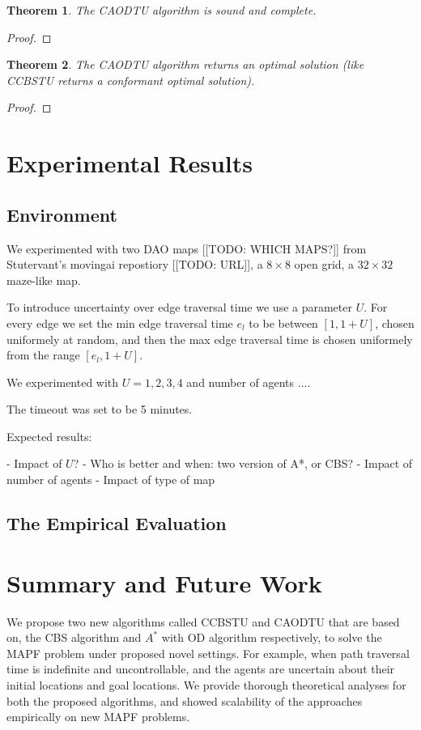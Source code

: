 \documentclass{article}
\newtheorem{theorem}{Theorem}
\begin{document}
{\begin{theorem}
The CAODTU algorithm is sound and complete.
\end{theorem}
\begin{proof}

\end{proof}

\begin{theorem}
The CAODTU algorithm returns an optimal solution (like CCBSTU returns a conformant optimal solution).
\end{theorem}
\begin{proof}

\end{proof}

\section{Experimental Results}

\subsection{Environment}

We experimented with 
two DAO maps [[TODO: WHICH MAPS?]] 
from Stutervant's movingai repostiory [[TODO: URL]], 
a $8\times 8$ open grid,
a $32\times 32$ maze-like map. 


To introduce uncertainty over edge traversal time we use a parameter $U$. 
For every edge we set the min edge traversal time $e_l$ to be between $[1,1+U]$, chosen uniformely at random, 
and then the max edge traversal time is chosen uniformely from the range $[e_l,1+U]$.


We experimented with $U=1,2,3,4$
and number of agents $....$

The timeout was set to be 5 minutes. 


Expected results:

- Impact of $U$?
- Who is better and when: two version of A*, or CBS?
- Impact of number of agents
- Impact of type of map

\subsection{The Empirical Evaluation}

\section{Summary and Future Work}
We propose two new algorithms called CCBSTU and CAODTU that are based on, the CBS algorithm and $A^*$ with OD algorithm respectively, to solve the MAPF problem under proposed novel settings. For example, when path traversal time is indefinite and uncontrollable, and the agents are uncertain about their initial locations and goal locations. We provide thorough theoretical analyses for both the proposed algorithms, and showed scalability of the approaches empirically on new MAPF problems.

}
\end{document}
